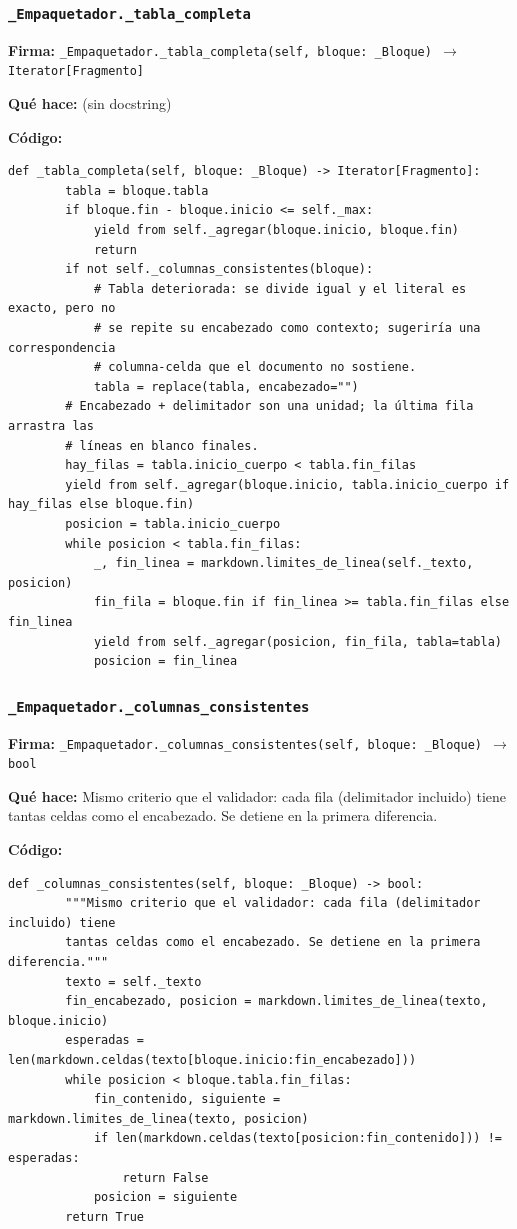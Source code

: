\documentclass[11pt,a4paper]{article}
\begin{document}
\subsubsection*{\texttt{\_Empaquetador.\_tabla\_completa}}
\textbf{Firma:} \texttt{\_Empaquetador.\_tabla\_completa(self, bloque: \_Bloque) $\rightarrow$ Iterator[Fragmento]}

\textbf{Qué hace:} (sin docstring)

\textbf{Código:}
\begin{lstlisting}
def _tabla_completa(self, bloque: _Bloque) -> Iterator[Fragmento]:
        tabla = bloque.tabla
        if bloque.fin - bloque.inicio <= self._max:
            yield from self._agregar(bloque.inicio, bloque.fin)
            return
        if not self._columnas_consistentes(bloque):
            # Tabla deteriorada: se divide igual y el literal es exacto, pero no
            # se repite su encabezado como contexto; sugeriría una correspondencia
            # columna-celda que el documento no sostiene.
            tabla = replace(tabla, encabezado="")
        # Encabezado + delimitador son una unidad; la última fila arrastra las
        # líneas en blanco finales.
        hay_filas = tabla.inicio_cuerpo < tabla.fin_filas
        yield from self._agregar(bloque.inicio, tabla.inicio_cuerpo if hay_filas else bloque.fin)
        posicion = tabla.inicio_cuerpo
        while posicion < tabla.fin_filas:
            _, fin_linea = markdown.limites_de_linea(self._texto, posicion)
            fin_fila = bloque.fin if fin_linea >= tabla.fin_filas else fin_linea
            yield from self._agregar(posicion, fin_fila, tabla=tabla)
            posicion = fin_linea
\end{lstlisting}

\subsubsection*{\texttt{\_Empaquetador.\_columnas\_consistentes}}
\textbf{Firma:} \texttt{\_Empaquetador.\_columnas\_consistentes(self, bloque: \_Bloque) $\rightarrow$ bool}

\textbf{Qué hace:} Mismo criterio que el validador: cada fila (delimitador incluido) tiene
tantas celdas como el encabezado. Se detiene en la primera diferencia.

\textbf{Código:}
\begin{lstlisting}
def _columnas_consistentes(self, bloque: _Bloque) -> bool:
        """Mismo criterio que el validador: cada fila (delimitador incluido) tiene
        tantas celdas como el encabezado. Se detiene en la primera diferencia."""
        texto = self._texto
        fin_encabezado, posicion = markdown.limites_de_linea(texto, bloque.inicio)
        esperadas = len(markdown.celdas(texto[bloque.inicio:fin_encabezado]))
        while posicion < bloque.tabla.fin_filas:
            fin_contenido, siguiente = markdown.limites_de_linea(texto, posicion)
            if len(markdown.celdas(texto[posicion:fin_contenido])) != esperadas:
                return False
            posicion = siguiente
        return True
\end{lstlisting}
\end{document}
